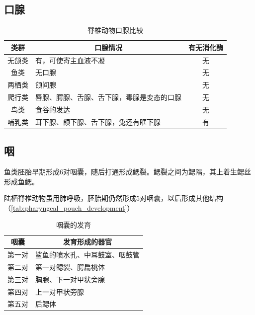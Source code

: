 \subsection{口腺}

\begin{table}[htbp]
	\centering
	\begin{tabularx}{\textwidth}{|c|X|c|}
		\hline
		\textbf{类群} & \multicolumn{1}{c|}{\textbf{口腺情况}} & \textbf{有无消化酶} \\ \hline
		无颌类 & 有，可使寄主血液不凝 & 无 \\ \hline
		鱼类 & 无口腺 & 无 \\ \hline
		两栖类 & 颌间腺 & 无 \\ \hline
		爬行类 & 唇腺、腭腺、舌腺、舌下腺，毒腺是变态的口腺 & 无 \\ \hline
		鸟类 & 食谷的发达 & 无\footnotemark \\ \hline
		哺乳类 & 耳下腺、颌下腺、舌下腺，兔还有眶下腺 & 有 \\ \hline
	\end{tabularx}
	\caption{脊椎动物口腺比较}
	\label{tab:oral_gland}
\end{table}

\subsection{咽}

鱼类胚胎早期形成6对咽囊，随后打通形成鳃裂。鳃裂之间为鳃隔，其上着生鳃丝形成鱼鳃。

陆栖脊椎动物虽用肺呼吸，胚胎期仍然形成5对咽囊，以后形成其他结构（\autoref{tab:pharyngeal_pouch_development}）

\begin{table}[htbp]
	\centering
	\begin{tabularx}{\textwidth}{|c|X|}
		\hline
		咽囊 & \multicolumn{1}{c|}{发育形成的器官} \\ \hline
		第一对 & 鲨鱼的喷水孔、中耳鼓室、咽鼓管 \\ \hline
		第二对 & 第一对鳃裂、腭扁桃体 \\ \hline
		第三对 & 胸腺、下一对甲状旁腺 \\ \hline
		第四对 & 上一对甲状旁腺 \\ \hline
		第五对 & 后鳃体 \\ \hline
	\end{tabularx}
	\caption{咽囊的发育}
	\label{tab:pharyngeal_pouch_development}
\end{table}

